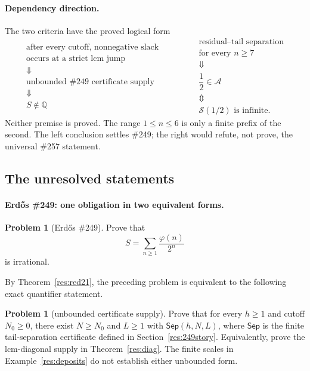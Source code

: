 \documentclass[11pt]{article}
\theoremstyle{definition}
\newtheorem{problem}[theorem]{Problem}
\theoremstyle{remark}
\newcommand{\Q}{\mathbb{Q}}
\newcommand{\ph}{\varphi}
\begin{document}
\paragraph{Dependency direction.}
The two criteria have the proved logical form
\[
\begin{array}{c}
 \text{after every cutoff, nonnegative slack}\\[-1pt]
 \text{occurs at a strict lcm jump}\\
 \Downarrow\\
 \text{unbounded \#249 certificate supply}\\
 \Downarrow\\
 S\notin\Q
\end{array}
\qquad\qquad
\begin{array}{c}
 \text{residual--tail separation}\\[-1pt]
 \text{for every }n\ge7\\
 \Downarrow\\
 \dfrac12\in\mathcal A\\
 \Updownarrow\\
 \mathcal S(1/2)\text{ is infinite}.
\end{array}
\]
Neither premise is proved.  The range \(1\le n\le6\) is only a finite prefix
of the second.  The left conclusion settles \#249; the right would refute,
not prove, the universal \#257 statement.

\subsection{The unresolved statements}\label{sec:unresolved}

\paragraph{Erd\H{o}s \#249: one obligation in two equivalent forms.}
\begin{problem}[Erd\H{o}s \#249]
Prove that
\[
S=\sum_{n\ge1}\frac{\ph(n)}{2^n}
\]
is irrational.
\end{problem}

By Theorem~\ref{res:red21}, the preceding problem is equivalent to the
following exact quantifier statement.

\begin{problem}[unbounded certificate supply]
Prove that for every \(h\ge1\) and cutoff \(N_0\ge0\), there exist
\(N\ge N_0\) and \(L\ge1\) with \(\mathsf{Sep}(h,N,L)\), where
\(\mathsf{Sep}\) is the finite tail-separation certificate defined in
Section~\ref{res:249story}.
Equivalently, prove the lcm-diagonal supply in
Theorem~\ref{res:diag}.  The finite scales in
Example~\ref{res:deposits} do not establish either unbounded form.
\end{problem}
\end{document}
